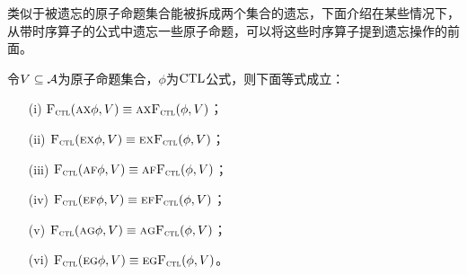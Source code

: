 类似于被遗忘的原子命题集合能被拆成两个集合的遗忘，下面介绍在某些情况下，从带时序算子的公式中遗忘一些原子命题，可以将这些时序算子提到遗忘操作的前面。
\begin{proposition}
	令$V\subseteq {\cal A}$为原子命题集合，$\phi$为$\textrm{CTL}$公式，则下面等式成立：
	\begin{itemize}
		\item[(i)] ${\textsc{F}_{\textsc{ctl}}}(\textsc{a}\textsc{x}\phi,V) \equiv \textsc{a} \textsc{x}{\textsc{F}_{\textsc{ctl}}}(\phi,V)$；
		\item[(ii)] ${\textsc{F}_{\textsc{ctl}}}(\textsc{e}\textsc{x}\phi,V) \equiv \textsc{e} \textsc{x}{\textsc{F}_{\textsc{ctl}}}(\phi,V)$；
		\item[(iii)] ${\textsc{F}_{\textsc{ctl}}}(\textsc{a}\textsc{f}\phi,V) \equiv \textsc{a}\textsc{f}{\textsc{F}_{\textsc{ctl}}}(\phi,V)$；
		\item[(iv)] ${\textsc{F}_{\textsc{ctl}}}(\textsc{e}\textsc{f}\phi,V) \equiv \textsc{e}\textsc{f}{\textsc{F}_{\textsc{ctl}}}(\phi,V)$；
		\item[(v)] ${\textsc{F}_{\textsc{ctl}}}(\textsc{a} \textsc{g}\phi,V)\equiv \textsc{a} \textsc{g}{\textsc{F}_{\textsc{ctl}}}(\phi,V)$；
		\item[(vi)] ${\textsc{F}_{\textsc{ctl}}}(\textsc{e}\textsc{g}\phi,V)\equiv\textsc{e}\textsc{g} {\textsc{F}_{\textsc{ctl}}}(\phi,V)$。
	\end{itemize}
\end{proposition}
